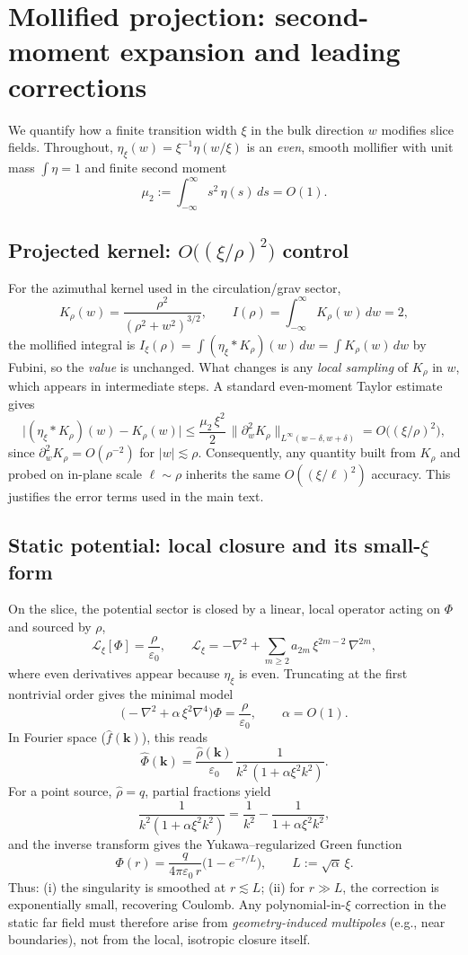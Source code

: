 \section{Mollified projection: second-moment expansion and leading corrections}
\label{app:mollified}

We quantify how a finite transition width $\xi$ in the bulk direction $w$ modifies slice fields. Throughout, $\eta_\xi(w)=\xi^{-1}\eta(w/\xi)$ is an \emph{even}, smooth mollifier with unit mass $\int\eta=1$ and finite second moment
\[
\mu_2:=\int_{-\infty}^{\infty} s^2\,\eta(s)\,ds=O(1).\tag{D.1}
\]

\subsection{Projected kernel: $O\big((\xi/\rho)^2\big)$ control}
For the azimuthal kernel used in the circulation/grav sector,
\[
K_\rho(w)=\frac{\rho^2}{(\rho^2+w^2)^{3/2}},\qquad I(\rho)=\int_{-\infty}^{\infty}K_\rho(w)\,dw=2,\tag{D.2}
\]
the mollified integral is $I_\xi(\rho)=\int (\eta_\xi*K_\rho)(w)\,dw= \int K_\rho(w)\,dw$ by Fubini, so the \emph{value} is unchanged. What changes is any \emph{local sampling} of $K_\rho$ in $w$, which appears in intermediate steps. A standard even-moment Taylor estimate gives
\[
\big|(\eta_\xi*K_\rho)(w)-K_\rho(w)\big|
\le \frac{\mu_2\,\xi^2}{2}\,\big\|\partial_w^2K_\rho\big\|_{L^\infty(w-\delta,w+\delta)}
=O\!\big((\xi/\rho)^2\big),\tag{D.3}
\]
since $\partial_w^2K_\rho=O(\rho^{-2})$ for $|w|\lesssim \rho$. Consequently, any quantity built from $K_\rho$ and probed on in-plane scale $\ell\sim\rho$ inherits the same $O((\xi/\ell)^2)$ accuracy. This justifies the error terms used in the main text.

\subsection{Static potential: local closure and its small-$\xi$ form}
On the slice, the potential sector is closed by a linear, local operator acting on $\Phi$ and sourced by $\rho$,
\[
\mathcal{L}_\xi[\Phi]=\frac{\rho}{\varepsilon_0},\qquad
\mathcal{L}_\xi=-\nabla^2+\sum_{m\ge 2} a_{2m}\,\xi^{2m-2}\,\nabla^{2m},\tag{D.4}
\]
where even derivatives appear because $\eta_\xi$ is even. Truncating at the first nontrivial order gives the minimal model
\[
\big(-\nabla^2+\alpha\,\xi^2\nabla^4\big)\Phi=\frac{\rho}{\varepsilon_0},\qquad \alpha=O(1).\tag{D.5}
\]
In Fourier space ($\hat f(\mathbf k)$), this reads
\[
\hat\Phi(\mathbf k)=\frac{\hat\rho(\mathbf k)}{\varepsilon_0}\,\frac{1}{k^2\,(1+\alpha\xi^2 k^2)}.\tag{D.6}
\]
For a point source, $\hat\rho=q$, partial fractions yield
\[
\frac{1}{k^2(1+\alpha\xi^2 k^2)}=\frac{1}{k^2}-\frac{1}{1+\alpha\xi^2 k^2},\tag{D.7}
\]
and the inverse transform gives the Yukawa–regularized Green function
\[
\Phi(r)=\frac{q}{4\pi\varepsilon_0\,r}\Big(1-e^{-r/L}\Big),\qquad L:=\sqrt{\alpha}\,\xi.\tag{D.8}
\]
Thus: (i) the singularity is smoothed at $r\!\lesssim\!L$; (ii) for $r\!\gg\!L$, the correction is exponentially small, recovering Coulomb. Any polynomial-in-$\xi$ correction in the static far field must therefore arise from \emph{geometry-induced multipoles} (e.g., near boundaries), not from the local, isotropic closure itself.

